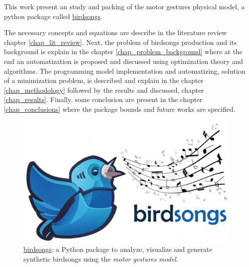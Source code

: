 This work present an study and packing of the motor gestures physical model, a python package called \href{https://github.com/saguileran/birdsongs/}{birdsongs}. \vspace{5pt}

\begin{minipage}{0.6\linewidth}
The necessary concepts and equations are describe in the literature review chapter \ref{chap_lit_review}. Next, the problem of birdsongs production and its background is explain in the chapter \ref{chap_problem_background} where at the end an automatization is proposed and discussed using optimization theory and algorithms. The programming model implementation and automatizing, solution of a minimization problem, is described and explain in the chapter \ref{chap_methodology} followed by the results and discussed, chapter \ref{chap_results}. Finally, some conclusion are present in the chapter \ref{chap_conclusions} where the package bounds and future works are specified.
\end{minipage}\hfill
\begin{minipage}{0.35\linewidth}
\begin{figure}[H]
    \centering
    \includegraphics[width=\linewidth]{Images/bird_logo.png}
    \caption{\href{https://github.com/saguileran/birdsongs}{birdsongs}: a Python package to analyze, visualize and generate synthetic birdsongs using the\textit{ motor gestures model}. }
    \label{fig:logo}
\end{figure}
\end{minipage}